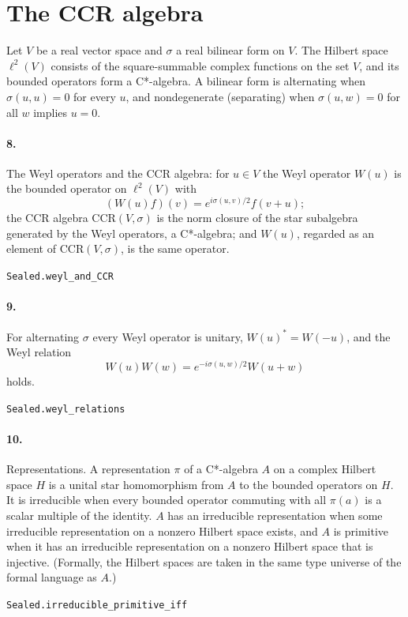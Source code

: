 \documentclass[11pt]{article}
\begin{document}
\section*{The CCR algebra}
Let $V$ be a real vector space and $\sigma$ a real bilinear form on $V$. The Hilbert space $\ell^2(V)$ consists of the square-summable complex functions on the set $V$, and its bounded operators form a C*-algebra. A bilinear form is alternating when $\sigma(u, u) = 0$ for every $u$, and nondegenerate (separating) when $\sigma(u, w) = 0$ for all $w$ implies $u = 0$.

\paragraph{8.} The Weyl operators and the CCR algebra: for $u \in V$ the Weyl operator $W(u)$ is the bounded operator on $\ell^2(V)$ with \[(W(u) f)(v) = e^{i\sigma(u, v)/2} f(v + u);\] the CCR algebra $\mathrm{CCR}(V, \sigma)$ is the norm closure of the star subalgebra generated by the Weyl operators, a C*-algebra; and $W(u)$, regarded as an element of $\mathrm{CCR}(V, \sigma)$, is the same operator.\par{\footnotesize\texttt{Sealed.weyl\_and\_CCR}}

\paragraph{9.} For alternating $\sigma$ every Weyl operator is unitary, $W(u)^* = W(-u)$, and the Weyl relation \[W(u) W(w) = e^{-i\sigma(u, w)/2} W(u + w)\] holds.\par{\footnotesize\texttt{Sealed.weyl\_relations}}

\paragraph{10.} Representations. A representation $\pi$ of a C*-algebra $A$ on a complex Hilbert space $H$ is a unital star homomorphism from $A$ to the bounded operators on $H$. It is irreducible when every bounded operator commuting with all $\pi(a)$ is a scalar multiple of the identity. $A$ has an irreducible representation when some irreducible representation on a nonzero Hilbert space exists, and $A$ is primitive when it has an irreducible representation on a nonzero Hilbert space that is injective. (Formally, the Hilbert spaces are taken in the same type universe of the formal language as $A$.)\par{\footnotesize\texttt{Sealed.irreducible\_primitive\_iff}}
\end{document}
